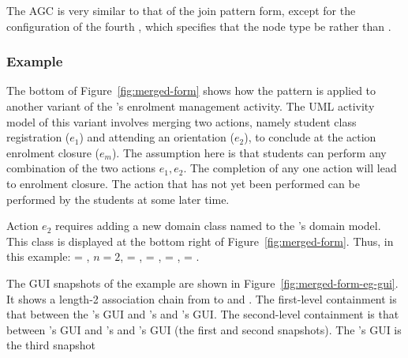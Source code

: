 The AGC is very similar to that of the join pattern form, except for the configuration of the fourth , which specifies that the node type be  rather than .
%
\subsubsection*{Example}
The bottom of Figure~\ref{fig:merged-form} shows how the pattern is applied to another variant of the \courseman's enrolment management activity. The UML activity model of this variant involves merging two actions, namely student class registration ($e_1$) and attending an orientation ($e_2$), to conclude at the action enrolment closure ($e_m$). The assumption here is that students can perform any combination of the two actions $e_1, e_2$. The completion of any one action will lead to enrolment closure. The action that has not yet been performed can be performed by the students at some later time.

Action $e_2$ requires adding a new domain class named  to the 's domain model. This class is displayed at the bottom right of Figure~\ref{fig:merged-form}. Thus, in this example:  = , $ n = 2 $,  = ,  = ,  = ,  = . 

The GUI snapshots of the example are shown in Figure~\ref{fig:merged-form-eg-gui}. It shows a length-2 association chain from  to  and . The first-level containment is that between the 's GUI and 's and 's GUI. The second-level containment is that between 's GUI and 's and 's GUI (the first and second snapshots). The 's GUI is the third snapshot
